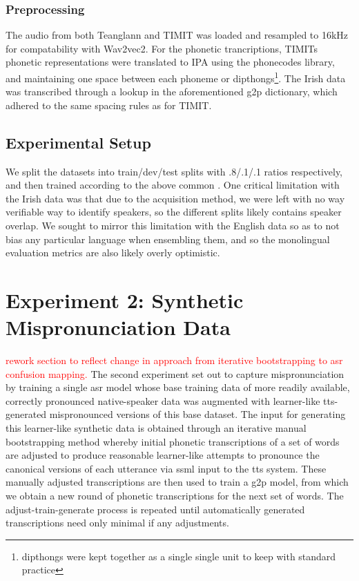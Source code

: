 \documentclass[thesis]{cluu}
\newcommand{\todo}[1]{\textcolor{red}{#1}}
\begin{document}
\subsubsection{Preprocessing}
The audio from both Teanglann and TIMIT was loaded and resampled to 16kHz for compatability with Wav2vec2. For the phonetic trancriptions, TIMITs phonetic representations were translated to IPA using the phonecodes library, and maintaining one space between each phoneme or dipthongs\footnote{dipthongs were kept together as a single single unit to keep with standard practice}. The Irish data was transcribed through a lookup in the aforementioned \gls{g2p} dictionary, which adhered to the same spacing rules as for TIMIT.

\subsection{Experimental Setup}
We split the datasets into train/dev/test splits with .8/.1/.1 ratios respectively, and then trained according to the above common . One critical limitation with the Irish data was that due to the acquisition method, we were left with no way verifiable way to identify speakers, so the different splits likely contains speaker overlap. We sought to mirror this limitation with the English data so as to not bias any particular language when ensembling them, and so the monolingual evaluation metrics are also likely overly optimistic. 

\section{Experiment 2: Synthetic Mispronunciation Data}
\todo{rework section to reflect change in approach from iterative bootstrapping to asr confusion mapping.}
The second experiment set out to capture mispronunciation by training a single \gls{asr} model whose base training data of more readily available, correctly pronounced native-speaker data was augmented with learner-like \gls{tts}-generated mispronounced versions of this base dataset. The input for generating this learner-like synthetic data is obtained through an iterative manual bootstrapping method whereby initial phonetic transcriptions of a set of words are adjusted to produce reasonable learner-like attempts to pronounce the canonical versions of each utterance via \gls{ssml} input to the \gls{tts} system. These manually adjusted transcriptions are then used to train a \gls{g2p} model, from which we obtain a new round of phonetic transcriptions for the next set of words. The adjust-train-generate process is repeated until automatically generated transcriptions need only minimal if any adjustments.
\end{document}
